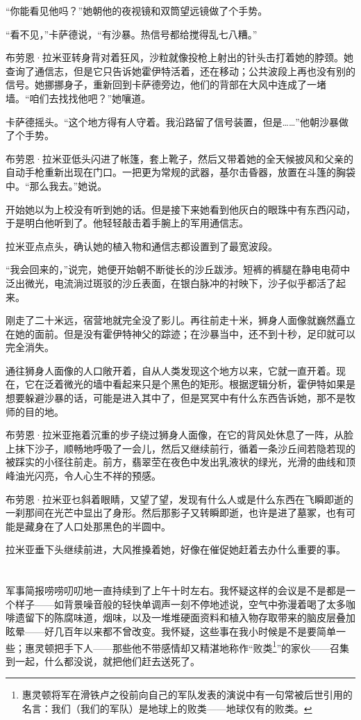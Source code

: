 \documentclass[AutoFakeBold=true]{book}
\begin{document}
``你能看见他吗？''她朝他的夜视镜和双筒望远镜做了个手势。

``看不见，''卡萨德说，``有沙暴。热信号都给搅得乱七八糟。''

布劳恩·拉米亚转身背对着狂风，沙粒就像投枪上射出的针头击打着她的脖颈。她查询了通信志，但是它只告诉她霍伊特活着，还在移动；公共波段上再也没有别的信号。她挪挪身子，重新回到卡萨德旁边，他们的背部在大风中连成了一堵墙。``咱们去找找他吧？''她嚷道。

卡萨德摇头。``这个地方得有人守着。我沿路留了信号装置，但是……''他朝沙暴做了个手势。

布劳恩·拉米亚低头闪进了帐篷，套上靴子，然后又带着她的全天候披风和父亲的自动手枪重新出现在门口。一把更为常规的武器，基尔击昏器，放置在斗篷的胸袋中。``那么我去。''她说。

开始她以为上校没有听到她的话。但是接下来她看到他灰白的眼珠中有东西闪动，于是明白他听到了。他轻轻敲击着手腕上的军用通信志。

拉米亚点点头，确认她的植入物和通信志都设置到了最宽波段。

``我会回来的，''说完，她便开始朝不断徙长的沙丘跋涉。短裤的裤腿在静电电荷中泛出微光，电流淌过斑驳的沙丘表面，在银白脉冲的衬映下，沙子似乎都活了起来。

刚走了二十米远，宿营地就完全没了影儿。再往前走十米，狮身人面像就巍然矗立在她的面前。但是没有霍伊特神父的踪迹；在沙暴当中，还不到十秒，足印就可以完全消失。

通往狮身人面像的人口敞开着，自从人类发现这个地方以来，它就一直开着。现在，它在泛着微光的墙中看起来只是个黑色的矩形。根据逻辑分析，霍伊特如果是想要躲避沙暴的话，可能是进入其中了，但是冥冥中有什么东西告诉她，那不是牧师的目的地。

布劳恩·拉米亚拖着沉重的步子绕过狮身人面像，在它的背风处休息了一阵，从脸上抹下沙子，顺畅地呼吸了一会儿，然后又继续前行，循着一条沙丘间若隐若现的被踩实的小径往前走。前方，翡翠茔在夜色中发出乳液状的绿光，光滑的曲线和顶峰油光闪亮，令人心生不祥的预感。

布劳恩·拉米亚乜斜着眼睛，又望了望，发现有什么人或是什么东西在飞瞬即逝的一刹那间在光芒中显出了身形。然后那影子又转瞬即逝，也许是进了墓冢，也有可能是藏身在了人口处那黑色的半圆中。

拉米亚垂下头继续前进，大风推搡着她，好像在催促她赶着去办什么重要的事。

\chapter{}

军事简报唠唠叨叨地一直持续到了上午十时左右。我怀疑这样的会议是不是都是一个样子——如背景噪音般的轻快单调声一刻不停地述说，空气中弥漫着喝了太多咖啡遗留下的陈腐味道，烟味，以及一堆堆硬面资料和植入物存取带来的脑皮层叠加眩晕——好几百年以来都不曾改变。我怀疑，这些事在我小时候是不是要简单一些；惠灵顿把手下人——那些他不带感情却又精湛地称作``败类\footnote{惠灵顿将军在滑铁卢之役前向自己的军队发表的演说中有一句常被后世引用的名言：我们（我们的军队）是地球上的败类——地球仅有的败类。}''的家伙——召集到一起，什么都没说，就把他们赶去送死了。
\end{document}
